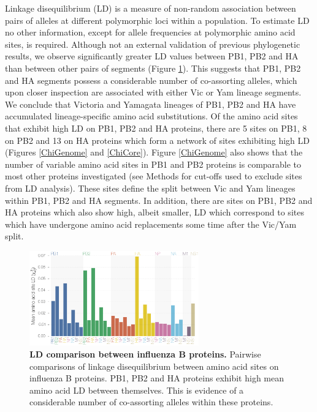 \documentclass[11pt,oneside,letterpaper]{article}
\begin{document}
Linkage disequilibrium (LD) is a measure of non-random association between pairs of alleles at different polymorphic loci within a population.
To estimate LD no other information, except for allele frequencies at polymorphic amino acid sites, is required.
Although not an external validation of previous phylogenetic results, we observe significantly greater LD values between PB1, PB2 and HA than between other pairs of segments (Figure \ref{segmentLD}).
This suggests that PB1, PB2 and HA segments possess a considerable number of co-assorting alleles, which upon closer inspection are associated with either Vic or Yam lineage segments.
We conclude that Victoria and Yamagata lineages of PB1, PB2 and HA have accumulated lineage-specific amino acid substitutions.
Of the amino acid sites that exhibit high LD on PB1, PB2 and HA proteins, there are 5 sites on PB1, 8 on PB2 and 13 on HA proteins which form a network of sites exhibiting high LD (Figures \ref{ChiGenome} and \ref{ChiCore}).
Figure \ref{ChiGenome} also shows that the number of variable amino acid sites in PB1 and PB2 proteins is comparable to most other proteins investigated (see Methods for cut-offs used to exclude sites from LD analysis).
These sites define the split between Vic and Yam lineages within PB1, PB2 and HA segments.
In addition, there are sites on PB1, PB2 and HA proteins which also show high, albeit smaller, LD which correspond to sites which have undergone amino acid replacements some time after the Vic/Yam split.

\begin{figure}[h]
	\centering	
	\includegraphics[width=0.65\textwidth]{figures/InfB_aaMeanLD.png}
	\caption{\textbf{LD comparison between influenza B proteins.}
Pairwise comparisons of linkage disequilibrium between amino acid sites on influenza B proteins.
PB1, PB2 and HA proteins exhibit high mean amino acid LD between themselves.
This is evidence of a considerable number of co-assorting alleles within these proteins.}
	\label{segmentLD}
\end{figure}
\end{document}
